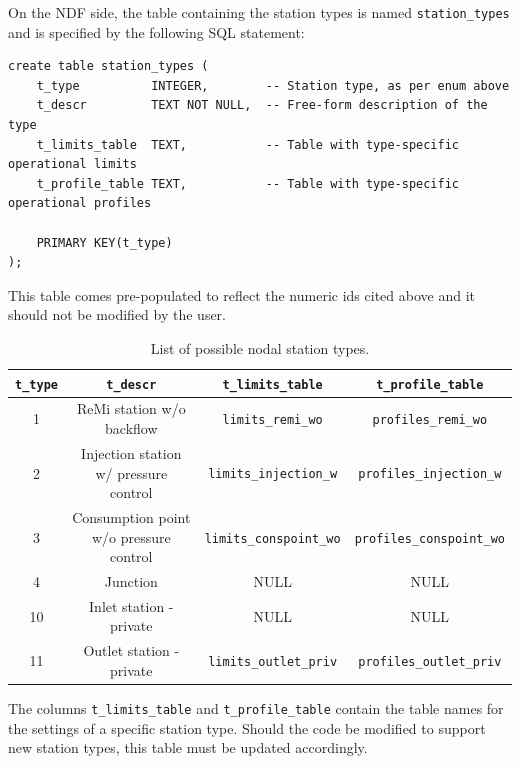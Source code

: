 On the NDF side, the table containing the station types is named
\texttt{station\_types} and is specified by the following SQL statement:
\begin{verbatim}
create table station_types (
    t_type          INTEGER,        -- Station type, as per enum above
    t_descr         TEXT NOT NULL,  -- Free-form description of the type
    t_limits_table  TEXT,           -- Table with type-specific operational limits
    t_profile_table TEXT,           -- Table with type-specific operational profiles

    PRIMARY KEY(t_type)
);
\end{verbatim}

This table comes pre-populated to reflect the numeric ids cited above and it
should not be modified by the user. 

\begin{table}[H]
    \centering
    \begin{tabular}{|c|c|c|c|}
    \hline 
    \texttt{t\_type} & \texttt{t\_descr} & \texttt{t\_limits\_table} & \texttt{t\_profile\_table} \\
    \hline
    1 & ReMi station w/o backflow & \texttt{limits\_remi\_wo} & \texttt{profiles\_remi\_wo} \\
    2 & Injection station w/ pressure control & \texttt{limits\_injection\_w} & \texttt{profiles\_injection\_w} \\
    3 & Consumption point w/o pressure control & \texttt{limits\_conspoint\_wo} & \texttt{profiles\_conspoint\_wo} \\
    4 & Junction & NULL & NULL \\
    10 & Inlet station - private & NULL & NULL \\
    11 & Outlet station - private & \texttt{limits\_outlet\_priv} & \texttt{profiles\_outlet\_priv} \\ \hline
    \end{tabular}
    \caption{List of possible nodal station types.}
\end{table}

The columns \texttt{t\_limits\_table} and \texttt{t\_profile\_table} contain the table names for the settings of a specific station type. Should the code be modified to support new station types, this table must be updated accordingly.



